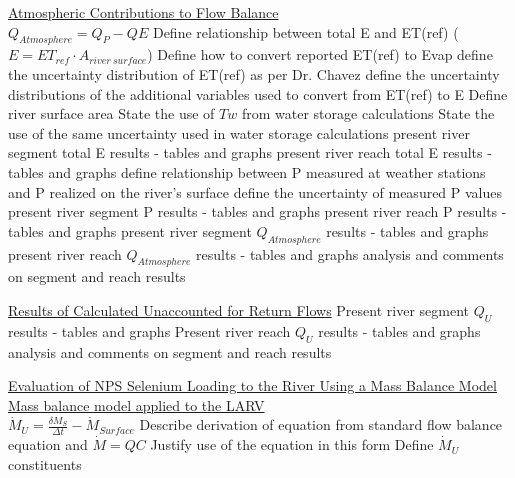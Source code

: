 \documentclass[12pt]{article}
\begin{document}
\begin{outline}[enumerate]
		\2 \underline{Atmospheric Contributions to Flow Balance}\\
			$Q_{Atmosphere} = Q_{P}-Q{E}$
			\3 Define relationship between total E and ET(ref) ($E=ET_{ref} \cdot A_{river~surface}$)
			\3 Define how to convert reported ET(ref) to Evap
				\4 define the uncertainty distribution of ET(ref) as per Dr. Chavez
				\4 define the uncertainty distributions of the additional variables used to convert from ET(ref) to E
			\3 Define river surface area
				\4 State the use of $Tw$ from water storage calculations
				\4 State the use of the same uncertainty used in water storage calculations
			\3 present river segment total E results - tables and graphs
			\3 present river reach total E results - tables and graphs
			\3 define relationship between P measured at weather stations and P realized on the river's surface
			\3 define the uncertainty of measured P values
			\3 present river segment P results - tables and graphs
			\3 present river reach P results - tables and graphs
			\3 present river segment $Q_{Atmosphere}$ results - tables and graphs
			\3 present river reach $Q_{Atmosphere}$ results - tables and graphs
			\3 analysis and comments on segment and reach results
			
		\2 \underline{Results of Calculated Unaccounted for Return Flows}
			\3 Present river segment $Q_{U}$ results - tables and graphs		
			\3 Present river reach $Q_{U}$ results - tables and graphs
			\3 analysis and comments on segment and reach results

	\1 \underline{Evaluation of NPS Selenium Loading to the River Using a Mass Balance Model}
		\2 \underline{Mass balance model applied to the LARV}\\
		$\dot{M}_U = \frac{\delta M_S}{\Delta t} - \dot{M}_{Surface}$
			\3 Describe derivation of equation from standard flow balance equation and $\dot{M}=QC$
			\3 Justify use of the equation in this form
			\3 Define $\dot{M}_U$ constituents


\end{outline}
\end{document}
